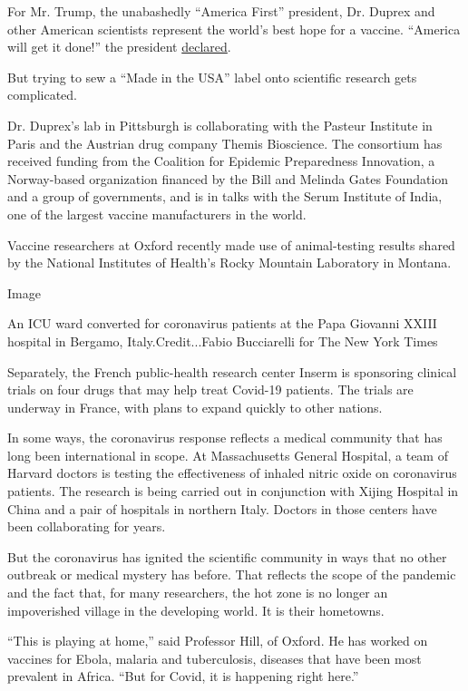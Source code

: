 For Mr. Trump, the unabashedly ``America First'' president, Dr. Duprex
and other American scientists represent the world's best hope for a
vaccine. ``America will get it done!'' the president
\href{https://twitter.com/realdonaldtrump/status/1237813728558678026}{declared}.

But trying to sew a ``Made in the USA'' label onto scientific research
gets complicated.

Dr. Duprex's lab in Pittsburgh is collaborating with the Pasteur
Institute in Paris and the Austrian drug company Themis Bioscience. The
consortium has received funding from the Coalition for Epidemic
Preparedness Innovation, a Norway-based organization financed by the
Bill and Melinda Gates Foundation and a group of governments, and is in
talks with the Serum Institute of India, one of the largest vaccine
manufacturers in the world.

Vaccine researchers at Oxford recently made use of animal-testing
results shared by the National Institutes of Health's Rocky Mountain
Laboratory in Montana.

Image

An ICU ward converted for coronavirus patients at the Papa Giovanni
XXIII hospital in Bergamo, Italy.Credit...Fabio Bucciarelli for The New
York Times

Separately, the French public-health research center Inserm is
sponsoring clinical trials on four drugs that may help treat Covid-19
patients. The trials are underway in France, with plans to expand
quickly to other nations.

In some ways, the coronavirus response reflects a medical community that
has long been international in scope. At Massachusetts General Hospital,
a team of Harvard doctors is testing the effectiveness of inhaled nitric
oxide on coronavirus patients. The research is being carried out in
conjunction with Xijing Hospital in China and a pair of hospitals in
northern Italy. Doctors in those centers have been collaborating for
years.

But the coronavirus has ignited the scientific community in ways that no
other outbreak or medical mystery has before. That reflects the scope of
the pandemic and the fact that, for many researchers, the hot zone is no
longer an impoverished village in the developing world. It is their
hometowns.

``This is playing at home,'' said Professor Hill, of Oxford. He has
worked on vaccines for Ebola, malaria and tuberculosis, diseases that
have been most prevalent in Africa. ``But for Covid, it is happening
right here.''

